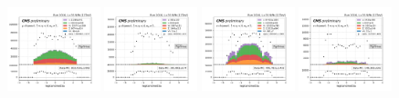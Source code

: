 \begin{figure}
    \includegraphics[width=0.24\textwidth]{chapters/Appendix/sectionQCD/figures/123j1b/mu_leptonOneEta_True.png}
    \includegraphics[width=0.24\textwidth]{chapters/Appendix/sectionQCD/figures/123j1b/mu_leptonOneEta_False.png}
    \includegraphics[width=0.24\textwidth]{chapters/Appendix/sectionQCD/figures/123j1b/e_leptonOneEta_True.png}
    \includegraphics[width=0.24\textwidth]{chapters/Appendix/sectionQCD/figures/123j1b/e_leptonOneEta_False.png}
    

\end{figure}
